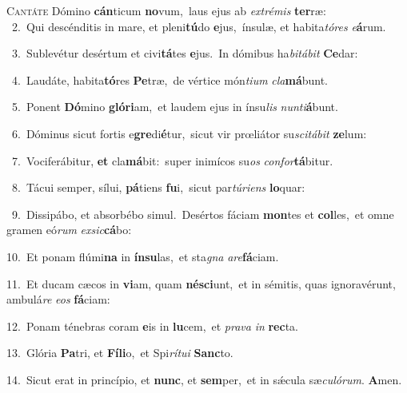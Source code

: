 \lettrine{\initial\textcolor{\initialcolor}{C}}{antáte} Dómino \textbf{cán}\-ticum \textbf{no}\-vum,~\star laus ejus ab \textit{ex}\-\textit{tré}\textit{mis} \textbf{ter}\-ræ:\\
{\numbfont\textcolor{\numbcolor}{~2.}}~Qui descénditis in mare, et pleni\-\textbf{tú}\-do \textbf{e}\-jus,~\star ínsulæ, et habita\-\textit{tó}\-\textit{res} \textit{e}\-\textbf{á}rum.\par
{\numbfont\textcolor{\numbcolor}{~3.}}~Sublevétur desértum et civi\-\textbf{tá}\-tes \textbf{e}\-jus.~\star In dómibus ha\-\textit{bi}\-\textit{tá}\textit{bit} \textbf{Ce}\-dar:\par
{\numbfont\textcolor{\numbcolor}{~4.}}~Laudáte, habita\-\textbf{tó}\-res \textbf{Pe}\-træ,~\star de vértice món\-\textit{ti}\-\textit{um} \textit{cla}\-\textbf{má}bunt.\par
{\numbfont\textcolor{\numbcolor}{~5.}}~Ponent \textbf{Dó}\-mino \textbf{gló}\-\textbf{ri}am,~\star et laudem ejus in ínsu\textit{lis} \textit{nun}\-\textit{ti}\textbf{á}bunt.\par
{\numbfont\textcolor{\numbcolor}{~6.}}~Dóminus sicut fortis e\-\textbf{gre}\-di\-\textbf{é}\-tur,~\star sicut vir prœliátor su\-\textit{sci}\-\textit{tá}\textit{bit} \textbf{ze}\-lum:\par
{\numbfont\textcolor{\numbcolor}{~7.}}~Vociferábitur, \textbf{et} cla\-\textbf{má}\-bit:~\star super inimícos su\textit{os} \textit{con}\-\textit{for}\textbf{tá}bitur.\par
{\numbfont\textcolor{\numbcolor}{~8.}}~Tácui semper, sílui, \textbf{pá}\-tiens \textbf{fu}\-i,~\star sicut par\-\textit{tú}\-\textit{ri}\textit{ens} \textbf{lo}\-quar:\par
{\numbfont\textcolor{\numbcolor}{~9.}}~Dissipábo, et absorbébo simul.~\dagger Desértos fáciam \textbf{mon}\-tes et \textbf{col}\-les,~\star et omne gramen eó\textit{rum} \textit{ex}\-\textit{sic}\textbf{cá}bo:\par
{\numbfont\textcolor{\numbcolor}{10.}}~Et ponam flúmi\textbf{na} in \textbf{ín}\-\textbf{su}las,~\star et sta\textit{gna} \textit{a}\-\textit{re}\textbf{fá}ciam.\par
{\numbfont\textcolor{\numbcolor}{11.}}~Et ducam cæcos in \textbf{vi}\-am, quam \textbf{né}\-\textbf{sci}unt,~\star et in sémitis, quas ignoravérunt, ambulá\textit{re} \textit{e}\-\textit{os} \textbf{fá}\-ciam:\par
{\numbfont\textcolor{\numbcolor}{12.}}~Ponam ténebras coram \textbf{e}\-is in \textbf{lu}\-cem,~\star et \textit{pra}\-\textit{va} \textit{in} \textbf{rec}\-ta.\par
{\numbfont\textcolor{\numbcolor}{13.}}~Glória \textbf{Pa}\-tri, et \textbf{Fí}\-\textbf{li}o,~\star et Spi\-\textit{rí}\-\textit{tu}\textit{i} \textbf{Sanc}\-to.\par
{\numbfont\textcolor{\numbcolor}{14.}}~Sicut erat in princípio, et \textbf{nunc}\-, et \textbf{sem}\-per,~\star et in sǽcula sæ\-\textit{cu}\-\textit{ló}\textit{rum}. \textbf{A}\-men.\par
